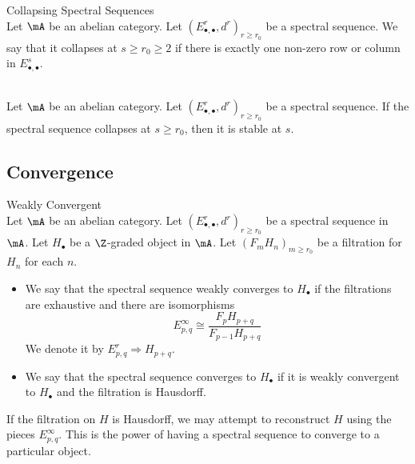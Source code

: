\documentclass[a4paper]{article}
\begin{document}
\begin{defn}{Collapsing Spectral Sequences}{}\\
Let $\mA$ be an abelian category. Let $(E_{\bullet,\bullet}^r,d^r)_{r\geq r_0}$ be a spectral sequence. We say that it collapses at $s\geq r_0\geq 2$ if there is exactly one non-zero row or column in $E_{\bullet,\bullet}^s$. 
\end{defn}

\begin{lmm}{}{}\\
Let $\mA$ be an abelian category. Let $(E_{\bullet,\bullet}^r,d^r)_{r\geq r_0}$ be a spectral sequence. If the spectral sequence collapses at $s\geq r_0$, then it is stable at $s$. 
\end{lmm}

\subsection{Convergence}
\begin{defn}{Weakly Convergent}{}\\
Let $\mA$ be an abelian category. Let $(E_{\bullet,\bullet}^r,d^r)_{r\geq r_0}$ be a spectral sequence in $\mA$. Let $H_\bullet$ be a $\Z$-graded object in $\mA$. Let $(F_mH_n)_{m\geq r_0}$ be a filtration for $H_n$ for each $n$. 
\begin{itemize}
\item We say that the spectral sequence weakly converges to $H_\bullet$ if the filtrations are exhaustive and there are isomorphisms $$E_{p,q}^\infty\cong\frac{F_pH_{p+q}}{F_{p-1}H_{p+q}}$$ We denote it by $E_{p,q}^r\Rightarrow H_{p+q}$. 
\item We say that the spectral sequence converges to $H_\bullet$ if it is weakly convergent to $H_\bullet$ and the filtration is Hausdorff. 
\end{itemize}
\end{defn}

If the filtration on $H$ is Hausdorff, we may attempt to reconstruct $H$ using the pieces $E_{p,q}^\infty$. This is the power of having a spectral sequence to converge to a particular object. 
\end{document}
